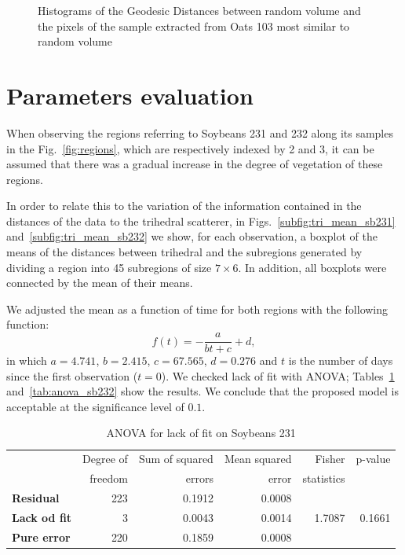 \documentclass[12pt]{article}
\begin{document}
\begin{figure}[hbt]
\centering
{}
\caption{Histograms of the Geodesic Distances between random volume and the pixels of the sample extracted from Oats 103 most similar to random volume}
\label{fig:ot103_hist_rv}
\end{figure}

\section{Parameters evaluation}
When observing the regions referring to Soybeans 231 and 232 along its samples in the Fig.~\ref{fig:regions}, which are respectively indexed by 2 and 3, it can be assumed that there was a gradual increase in the degree of vegetation of these regions.

In order to relate this to the variation of the information contained in the distances of the data to the trihedral scatterer, in Figs.~\ref{subfig:tri_mean_sb231} and~\ref{subfig:tri_mean_sb232} we show, for each observation, a boxplot of the means of the distances between trihedral and the subregions generated by dividing a region into 45 subregions of size $7\times 6$.
In addition, all boxplots were connected by the mean of their means.

We adjusted the mean as a function of time for both regions with the following function:
\begin{equation}
f(t) = -\frac{a}{bt + c} + d,
\end{equation}
in which $a = 4.741$, $b = 2.415$, $c = 67.565$, $d = 0.276$ and $t$ is the number of days since the first observation ($t = 0$). 
We checked lack of fit with ANOVA; Tables~\ref{tab:anova_sb231} and~\ref{tab:anova_sb232} show the results. 
We conclude that the proposed model is acceptable at the significance level of $0.1$.

\begin{table}[hbt]
  \centering
  \caption{ANOVA for lack of fit on Soybeans 231}
  \label{tab:anova_sb231}
  \begin{tabular}{lrrrrr}
    \toprule
    & Degree of & Sum of squared & Mean squared & Fisher & p-value\\
    & freedom & errors & error & statistics &\\
    \cmidrule(lr){2-6}
    \textbf{Residual} & 223 & 0.1912 & 0.0008 & &\\
    \textbf{Lack od fit} & 3 & 0.0043 & 0.0014 & 1.7087 & 0.1661\\
    \textbf{Pure error} & 220 & 0.1859 & 0.0008 & &\\
    \bottomrule
  \end{tabular}
\end{table}
\end{document}
